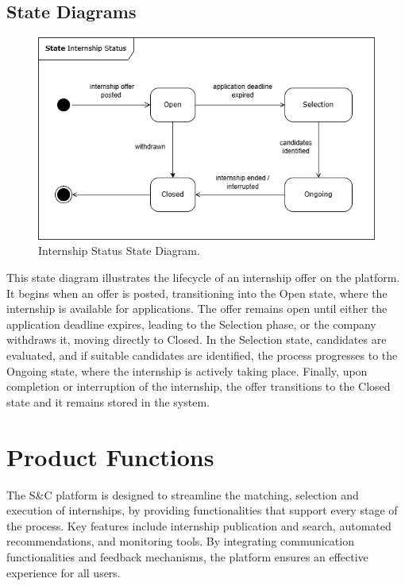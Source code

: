 \subsection{State Diagrams}
\label{subsec:state_diagrams}

\begin{figure}[H]
    \begin{center}
        \includegraphics[width=1\linewidth]{LaTeXCode/images/State_diagram_internship.png}
        \caption{Internship Status State Diagram.}
        \label{fig:internship_state_diagram}%
    \end{center}
\end{figure}

This state diagram illustrates the lifecycle of an internship offer on the platform. It begins when an offer is posted, transitioning into the Open state, where the internship is available for applications. The offer remains open until either the application deadline expires, leading to the Selection phase, or the company withdraws it, moving directly to Closed. In the Selection state, candidates are evaluated, and if suitable candidates are identified, the process progresses to the Ongoing state, where the internship is actively taking place. Finally, upon completion or interruption of the internship, the offer transitions to the Closed state and it remains stored in the system.

\section{Product Functions}
\label{sec:product_functions}

The S\&C platform is designed to streamline the matching, selection and execution of internships, by providing functionalities that support every stage of the process. Key features include internship publication and search, automated recommendations, and monitoring tools. By integrating communication functionalities and feedback mechanisms, the platform ensures an effective experience for all users.

